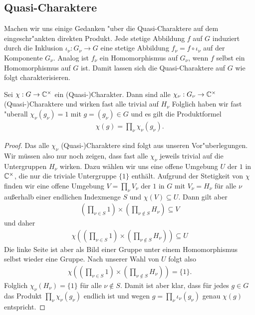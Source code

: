 \subsection{Quasi-Charaktere}
		Machen wir uns einige Gedanken "uber die Quasi-Charaktere auf dem eingeschr"ankten direkten Produkt.
		Jede stetige Abbildung $f$ auf $G$ induziert durch die Inklusion $\iota_\nu: G_\nu \to G$ eine stetige Abbildung  $f_\nu = f \circ \iota_\nu$ auf der Komponente $G_\nu$.
		Analog ist $f_\nu$ ein Homomorphismus auf $G_\nu$, wenn $f$ selbst ein Homomorphismus auf $G$ ist.
		Damit lassen sich die Quasi-Charaktere auf $G$ wie folgt charakterisieren.
		\begin{lemma}\label{lemma:rdp:char}
			Sei $\chi:G \to \mathbb{C}^\times$ ein (Quasi-)Charakter. 
			Dann sind alle $\chi_\nu: G_\nu \to \mathbb{C}^\times$ (Quasi-)Charaktere und wirken fast alle trivial auf $H_\nu$
			Folglich haben wir fast "uberall $\chi_\nu (g_\nu) = 1$ mit $g=(g_\nu)\in G$ und es gilt die Produktformel
			\begin{align*}
				\chi(g) = \prod_\nu \chi_\nu(g_\nu).
			\end{align*}
		\end{lemma}
		\begin{proof}
			Das alle $\chi_\nu$ (Quasi-)Charaktere sind folgt aus unseren Vor"uberlegungen.
			Wir müssen also nur noch zeigen, dass fast alle $\chi_\nu$ jeweils trivial auf die Untergruppen $H_\nu$ wirken. 
			Dazu wählen wir uns eine offene Umgebung $U$ der $1$ in $\mathbb{C}^\times$, die nur die triviale Untergruppe $\{1\}$ enthält. 
			Aufgrund der Stetigkeit von $\chi$ finden wir eine offene Umgebung $V=\prod_\nu V_\nu$ der $1$ in $G$ mit $V_\nu = H_\nu$ für alle $\nu$ außerhalb einer endlichen Indexmenge $S$ und $\chi(V)\subseteq U$.
			Dann gilt aber
			\begin{align*}
				(\prod_{\nu\in S} 1) \times (\prod_{\nu \notin S} H_\nu) \subseteq V 
			\end{align*}
			und daher
			\begin{align*}
				\chi((\prod_{\nu\in S} 1) \times (\prod_{\nu \notin S} H_\nu)) \subseteq U 
			\end{align*}
			Die linke Seite ist aber als Bild einer Gruppe unter einem Homomorphismus selbst wieder eine Gruppe. 
			Nach unserer Wahl von $U$ folgt also
			\begin{align*}
				\chi((\prod_{\nu\in S} 1) \times (\prod_{\nu \notin S} H_\nu)) = \{1\}.
			\end{align*}
			Folglich $\chi_\nu (H_\nu) = \{1\}$ für alle $\nu\notin S$. 
			Damit ist aber klar, dass für jedes $g \in G$ das Produkt $\prod_\nu \chi_\nu(g_\nu)$ endlich ist und wegen $g = \prod_{\nu} \iota_\nu(g_\nu)$ genau $\chi(g)$ entspricht.
			
		\end{proof}
